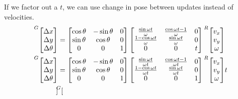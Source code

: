 If we factor out a $t$, we can use change in pose between updates instead of
velocities.
\begin{align}
  \crdfrm{G}{\begin{bmatrix}
    \Delta x \\
    \Delta y \\
    \Delta \theta
  \end{bmatrix}} &=
  \begin{bmatrix}
    \cos\theta & -\sin\theta & 0 \\
    \sin\theta &  \cos\theta & 0 \\
             0 &           0 & 1
  \end{bmatrix}
  \begin{bmatrix}
    \frac{\sin\omega t}{\omega} & \frac{\cos\omega t - 1}{\omega} & 0 \\
    \frac{1 - \cos\omega t}{\omega} & \frac{\sin\omega t}{\omega} & 0 \\
    0 & 0 & t
  \end{bmatrix}
  \crdfrm{R}{\begin{bmatrix}
    v_x \\
    v_y \\
    \omega
  \end{bmatrix}} \nonumber \\
  \crdfrm{G}{\begin{bmatrix}
    \Delta x \\
    \Delta y \\
    \Delta \theta
  \end{bmatrix}} &=
  \begin{bmatrix}
    \cos\theta & -\sin\theta & 0 \\
    \sin\theta &  \cos\theta & 0 \\
             0 &           0 & 1
  \end{bmatrix}
  \begin{bmatrix}
    \frac{\sin\omega t}{\omega t} & \frac{\cos\omega t - 1}{\omega t} & 0 \\
    \frac{1 - \cos\omega t}{\omega t} & \frac{\sin\omega t}{\omega t} & 0 \\
    0 & 0 & 1
  \end{bmatrix}
  \crdfrm{R}{\begin{bmatrix}
    v_x \\
    v_y \\
    \omega
  \end{bmatrix}} t \nonumber \\
  \crdfrm{G}{\begin{bmatrix}

\end{bmatrix}}
\end{align}
